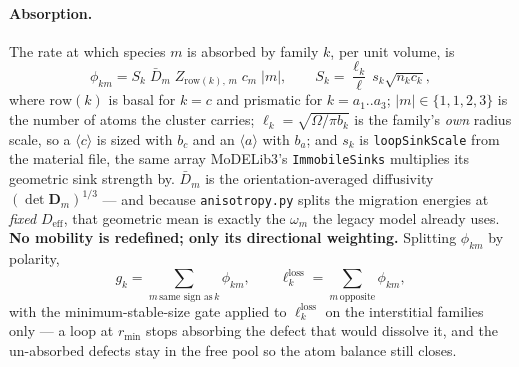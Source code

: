 \documentclass[11pt]{article}
\newcommand{\aloop}{\ensuremath{\langle a\rangle}}
\newcommand{\cloop}{\ensuremath{\langle c\rangle}}
\newcommand{\MoD}{\textsf{MoDELib3}}
\newcommand{\code}[1]{\texttt{\small #1}}
\begin{document}
\paragraph{Absorption.} The rate at which species $m$ is absorbed by family
$k$, per unit volume, is
%
\begin{equation}
  \phi_{km} = S_k \; \bar{D}_m \; Z_{\mathrm{row}(k),\,m} \; c_m \; |m| ,
  \qquad
  S_k = \frac{\ell_k}{\ell}\, s_k \sqrt{n_k c_k},
  \label{eq:phikm}
\end{equation}
%
where $\mathrm{row}(k)$ is basal for $k=c$ and prismatic for $k=a_1..a_3$;
$|m| \in \{1,1,2,3\}$ is the number of atoms the cluster carries;
$\ell_k = \sqrt{\Omega/\pi b_k}$ is the family's \emph{own} radius scale, so a
\cloop{} is sized with $b_c$ and an \aloop{} with $b_a$; and $s_k$ is
\code{loopSinkScale} from the material file, the same array \MoD{}'s
\code{ImmobileSinks} multiplies its geometric sink strength by. $\bar{D}_m$ is
the orientation-averaged diffusivity $(\det \mathbf{D}_m)^{1/3}$ --- and
because \code{anisotropy.py} splits the migration energies at \emph{fixed}
$D_{\text{eff}}$, that geometric mean is exactly the $\omega_m$ the legacy
model already uses. \textbf{No mobility is redefined; only its directional
weighting.} Splitting $\phi_{km}$ by polarity,
%
\begin{equation}
  g_k = \!\!\sum_{m \,\text{same sign as}\, k}\!\! \phi_{km},
  \qquad
  \ell_k^{\text{loss}} = \!\!\sum_{m \,\text{opposite}}\!\! \phi_{km},
\end{equation}
%
with the minimum-stable-size gate applied to $\ell_k^{\text{loss}}$ on the
interstitial families only --- a loop at $r_{\min}$ stops absorbing the defect
that would dissolve it, and the un-absorbed defects stay in the free pool so
the atom balance still closes.
\end{document}
